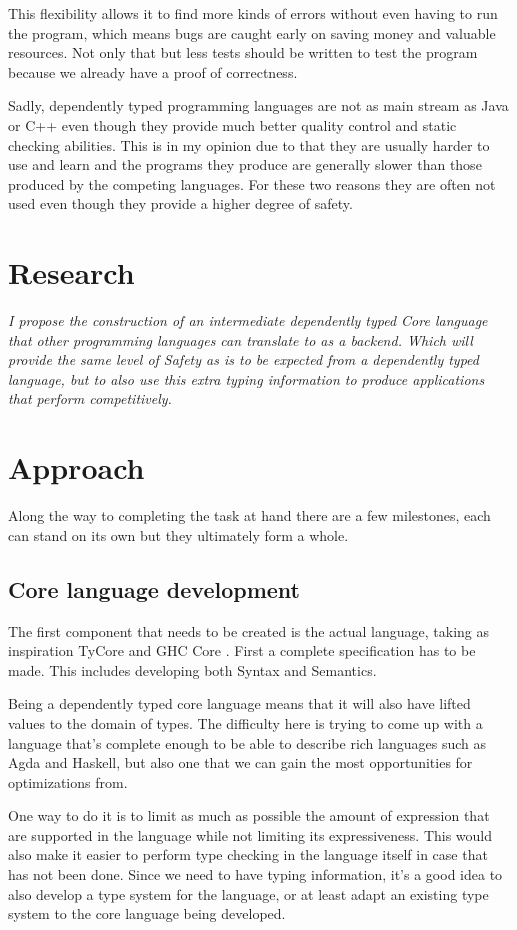 \documentclass[11pt,twoside,a4paper]{article}
\begin{document}
This flexibility allows it to find more kinds of errors without even having to run the program, which means bugs are caught early on saving money and valuable resources. Not only that but less tests should be written to test the program because we already have a proof of correctness.

Sadly, dependently typed programming languages are not as main stream as Java or C++ even though they provide much better quality control and static checking abilities. This is in my opinion due to that they are usually harder to use and learn and the programs they produce are generally slower than those produced by the competing languages. For these two reasons they are often not used even though they provide a higher degree of safety.
\section{Research}
\emph{I propose the construction of an intermediate dependently typed Core language that other programming languages can translate to as a backend. Which will provide the same level of Safety as is to be expected from a dependently typed language, but to also use this extra typing information to produce applications that perform competitively.}

\section{Approach}
Along the way to completing the task at hand there are a few milestones, each can stand on its own but they ultimately form a whole.

\subsection{Core language development}
The first component that needs to be created is the actual language, taking as inspiration TyCore \cite{super} and GHC Core \cite{pierce}. First a complete specification has to be made. This includes developing both Syntax and Semantics. 

Being a dependently typed core language means that it will also have lifted values to the domain of types. The difficulty here is trying to come up with a language that's complete enough to be able to describe rich languages such as Agda and Haskell, but also one that we can gain the most opportunities for optimizations from. 

One way to do it is to limit as much as possible the amount of expression that are supported in the language while not limiting its expressiveness.  This would also make it easier to perform type checking in the language itself in case that has not been done. Since we need to have typing information, it's a good idea to also develop a type system for the language, or at least adapt an existing type system to the core language being developed.
\end{document}
